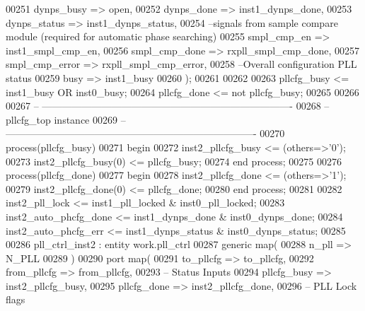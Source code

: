 \begin{DoxyCode}
00251    dynps_busy        => \textcolor{keywordflow}{open},
00252    dynps_done        => inst1_dynps_done,
00253    dynps_status      => inst1_dynps_status,
00254 \textcolor{keyword}{   --signals from sample compare module (required for automatic phase searching)}
00255    smpl_cmp_en       => inst1_smpl_cmp_en,
00256    smpl_cmp_done     => rxpll_smpl_cmp_done,
00257    smpl_cmp_error    => rxpll_smpl_cmp_error,
00258 \textcolor{keyword}{   --Overall configuration PLL status}
00259    busy              => inst1_busy   
00260    \textcolor{vhdlchar}{)};
00261 
00262   
00263    \textcolor{vhdlchar}{pllcfg_busy} \textcolor{vhdlchar}{<=} \textcolor{vhdlchar}{inst1_busy} \textcolor{keywordflow}{OR} \textcolor{vhdlchar}{inst0_busy};
00264    \textcolor{vhdlchar}{pllcfg_done} \textcolor{vhdlchar}{<=} \textcolor{keywordflow}{not} \textcolor{vhdlchar}{pllcfg_busy};
00265    
00266    
00267 \textcolor{keyword}{-- ----------------------------------------------------------------------------}
00268 \textcolor{keyword}{-- pllcfg\_top instance}
00269 \textcolor{keyword}{-- ----------------------------------------------------------------------------}
00270    \textcolor{keywordflow}{process}(pllcfg_busy) 
00271 \textcolor{vhdlkeyword}{      begin }
00272          inst2\_pllcfg\_busy <= (others=>'0');
00273          inst2\_pllcfg\_busy(\textcolor{vhdllogic}{0}) <= pllcfg\_busy;
00274    \textcolor{keywordflow}{end} \textcolor{keywordflow}{process};
00275    
00276    \textcolor{keywordflow}{process}(pllcfg_done) 
00277 \textcolor{vhdlkeyword}{      begin }
00278          inst2\_pllcfg\_done <= (others=>'1');
00279          inst2\_pllcfg\_done(\textcolor{vhdllogic}{0}) <= pllcfg\_done;
00280    \textcolor{keywordflow}{end} \textcolor{keywordflow}{process};
00281    
00282    inst2\_pll\_lock          <= inst1\_pll\_locked     & inst0\_pll\_locked;   
00283    inst2\_auto\_phcfg\_done   <= inst1\_dynps\_done     & inst0\_dynps\_done; 
00284    inst2\_auto\_phcfg\_err    <= inst1\_dynps\_status   & inst0\_dynps\_status;
00285 
00286    pll\_ctrl\_inst2 : \textcolor{keywordflow}{entity} work.pll_ctrl 
00287    \textcolor{keywordflow}{generic} \textcolor{keywordflow}{map}(
00288       n\_pll => N_PLL
00289    \textcolor{vhdlchar}{)}
00290    \textcolor{keywordflow}{port} \textcolor{keywordflow}{map}(
00291       to_pllcfg         => to_pllcfg,
00292       from_pllcfg       => from_pllcfg,
00293 \textcolor{keyword}{         -- Status Inputs}
00294       pllcfg_busy       => inst2_pllcfg_busy,
00295       pllcfg_done       => inst2_pllcfg_done,
00296 \textcolor{keyword}{         -- PLL Lock flags}

\end{DoxyCode}
